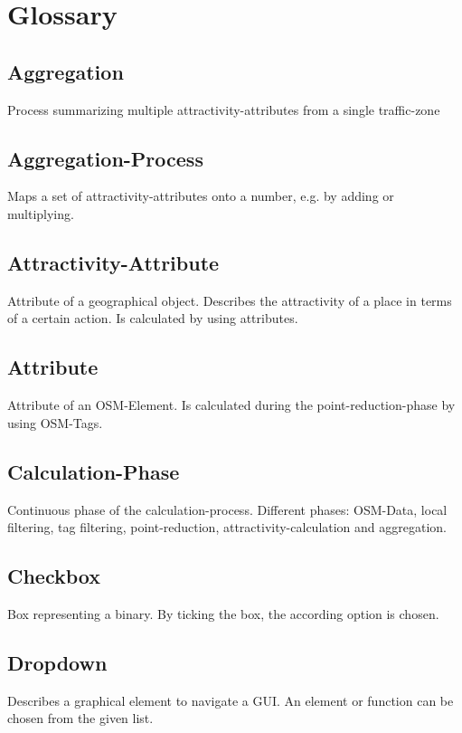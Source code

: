 \documentclass[letterpaper,10pt,english]{sphinxmanual}
\begin{document}
\chapter{Glossary}
\label{\detokenize{index:Glossary}}
\sphinxstepscope

\section*{Aggregation}
Process summarizing multiple attractivity-attributes from a single traffic-zone

\section*{Aggregation-Process}
Maps a set of attractivity-attributes onto a number, e.g. by adding or multiplying.

\section*{Attractivity-Attribute}
Attribute of a geographical object. Describes the attractivity of a place in terms of a certain action. Is calculated by using attributes.

\section*{Attribute}
Attribute of an OSM-Element. Is calculated during the point-reduction-phase by using OSM-Tags.

\section*{Calculation-Phase}
Continuous phase of the calculation-process. Different phases: OSM-Data, local filtering, tag filtering, point-reduction, attractivity-calculation and aggregation.

\section*{Checkbox}
Box representing a binary. By ticking the box, the according option is chosen.

\section*{Dropdown}
Describes a graphical element to navigate a GUI. An element or function can be chosen from the given list.
\end{document}
